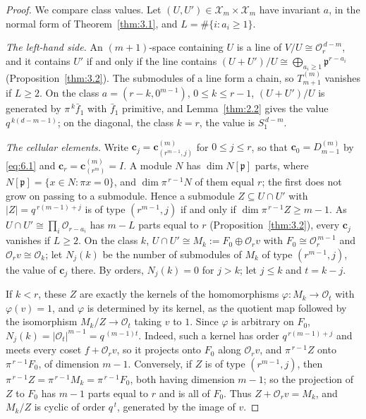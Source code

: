 \documentclass[11pt]{article}
\numberwithin{equation}{section}
\theoremstyle{plain}
\theoremstyle{definition}
\begin{document}
\begin{proof}
We compare class values. Let $(U,U')\in \mathcal{X}_m\times \mathcal{X}_m$ have invariant $a$,
in the normal form of Theorem~\ref{thm:3.1}, and $L=\#\{i:a_i\ge1\}$.

\emph{The left-hand side.} An $(m+1)$-space containing $U$ is a line of
$V/U\cong\mathcal{O}_r^{\,d-m}$, and it contains $U'$ if and only if the line contains
$(U+U')/U\cong\bigoplus_{a_i\ge1}\mathfrak{p}^{r-a_i}$ (Proposition~\ref{thm:3.2}). The
submodules of a line form a chain, so $T^{(m)}_{m+1}$ vanishes if $L\ge2$. On the class
$a=(r-k,0^{m-1})$, $0\le k\le r-1$, $(U+U')/U$ is generated by $\pi^{\,k}\bar f_1$ with
$\bar f_1$ primitive, and Lemma~\ref{thm:2.2} gives the value $q^{\,k(d-m-1)}$; on the
diagonal, the class $k=r$, the value is $S^{\,d-m}_1$.

\emph{The cellular elements.} Write $\mathbf c_j=\mathbf c^{(m)}_{(r^{m-1},j)}$ for
$0\le j\le r$, so that $\mathbf c_0=D^{(m)}_{m-1}$ by \eqref{eq:6.1} and
$\mathbf c_r=\mathbf c^{(m)}_{(r^m)}=I$. A module $N$ has $\dim N[\mathfrak{p}]$ parts, where
$N[\mathfrak{p}]=\{x\in N:\pi x=0\}$, and $\dim\pi^{\,r-1}N$ of them equal $r$; the first
does not grow on passing to a submodule. Hence a submodule $Z\subseteq U\cap U'$ with
$|Z|=q^{\,r(m-1)+j}$ is of type $(r^{m-1},j)$ if and only if $\dim\pi^{\,r-1}Z\ge m-1$. As
$U\cap U'\cong\prod_i\mathcal{O}_{r-a_i}$ has $m-L$ parts equal to $r$
(Proposition~\ref{thm:3.2}), every $\mathbf c_j$ vanishes if $L\ge2$. On the class $k$,
$U\cap U'\cong M_k:=F_0\oplus\mathcal{O}_rv$ with $F_0\cong\mathcal{O}_r^{\,m-1}$ and
$\mathcal{O}_rv\cong\mathcal{O}_k$; let $N_j(k)$ be the number of submodules of $M_k$ of type
$(r^{m-1},j)$, the value of $\mathbf c_j$ there. By orders, $N_j(k)=0$ for $j>k$; let
$j\le k$ and $t=k-j$.

If $k<r$, these $Z$ are exactly the kernels of the homomorphisms
$\varphi\colon M_k\to\mathcal{O}_t$ with $\varphi(v)=1$, and $\varphi$ is determined by its
kernel, as the quotient map followed by the isomorphism $M_k/Z\to\mathcal{O}_t$ taking $v$
to $1$. Since $\varphi$ is arbitrary on $F_0$, $N_j(k)=|\mathcal{O}_t|^{m-1}=q^{\,(m-1)t}$.
Indeed, such a kernel has order $q^{\,r(m-1)+j}$ and meets every coset $f+\mathcal{O}_rv$, so
it projects onto $F_0$ along $\mathcal{O}_rv$, and $\pi^{\,r-1}Z$ onto $\pi^{\,r-1}F_0$, of
dimension $m-1$. Conversely, if $Z$ is of type $(r^{m-1},j)$, then
$\pi^{\,r-1}Z=\pi^{\,r-1}M_k=\pi^{\,r-1}F_0$, both having dimension $m-1$; so the projection
of $Z$ to $F_0$ has $m-1$ parts equal to $r$ and is all of $F_0$. Thus
$Z+\mathcal{O}_rv=M_k$, and $M_k/Z$ is cyclic of order $q^{\,t}$, generated by the image of $v$.


\end{proof}
\end{document}
